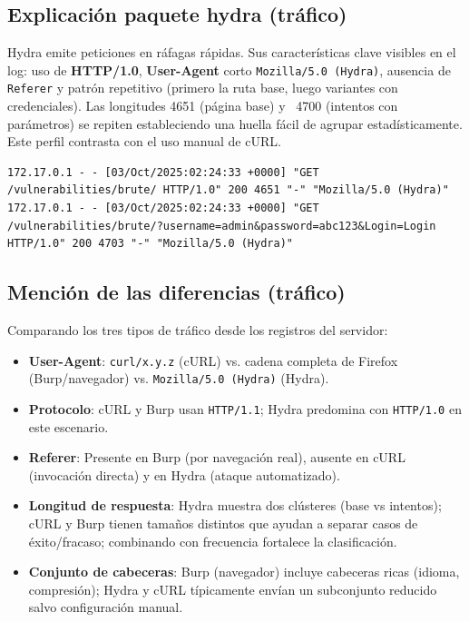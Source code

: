 \documentclass[letterpaper,12pt]{article}
\let\origsubsection\subsection
\renewcommand{\subsection}{\FloatBarrier\origsubsection}
\begin{document}
\subsection{Explicación paquete hydra (tráfico)}
Hydra emite peticiones en ráfagas rápidas. Sus características clave visibles en el log: uso de \textbf{HTTP/1.0}, \textbf{User-Agent} corto \texttt{Mozilla/5.0 (Hydra)}, ausencia de \texttt{Referer} y patrón repetitivo (primero la ruta base, luego variantes con credenciales). Las longitudes 4651 (página base) y ~4700 (intentos con parámetros) se repiten estableciendo una huella fácil de agrupar estadísticamente. Este perfil contrasta con el uso manual de cURL.
\begin{Verbatim}[breaklines=true,breakanywhere=true]
172.17.0.1 - - [03/Oct/2025:02:24:33 +0000] "GET /vulnerabilities/brute/ HTTP/1.0" 200 4651 "-" "Mozilla/5.0 (Hydra)"
172.17.0.1 - - [03/Oct/2025:02:24:33 +0000] "GET /vulnerabilities/brute/?username=admin&password=abc123&Login=Login HTTP/1.0" 200 4703 "-" "Mozilla/5.0 (Hydra)"
\end{Verbatim}

\subsection{Mención de las diferencias (tráfico)}
Comparando los tres tipos de tráfico desde los registros del servidor:
\begin{itemize}
    \item \textbf{User-Agent}: \texttt{curl/x.y.z} (cURL) vs. cadena completa de Firefox (Burp/navegador) vs. \texttt{Mozilla/5.0 (Hydra)} (Hydra).
    \item \textbf{Protocolo}: cURL y Burp usan \texttt{HTTP/1.1}; Hydra predomina con \texttt{HTTP/1.0} en este escenario.
    \item \textbf{Referer}: Presente en Burp (por navegación real), ausente en cURL (invocación directa) y en Hydra (ataque automatizado).
    \item \textbf{Longitud de respuesta}: Hydra muestra dos clústeres (base vs intentos); cURL y Burp tienen tamaños distintos que ayudan a separar casos de éxito/fracaso; combinando con frecuencia fortalece la clasificación.
    \item \textbf{Conjunto de cabeceras}: Burp (navegador) incluye cabeceras ricas (idioma, compresión); Hydra y cURL típicamente envían un subconjunto reducido salvo configuración manual.
\end{itemize}
\end{document}
